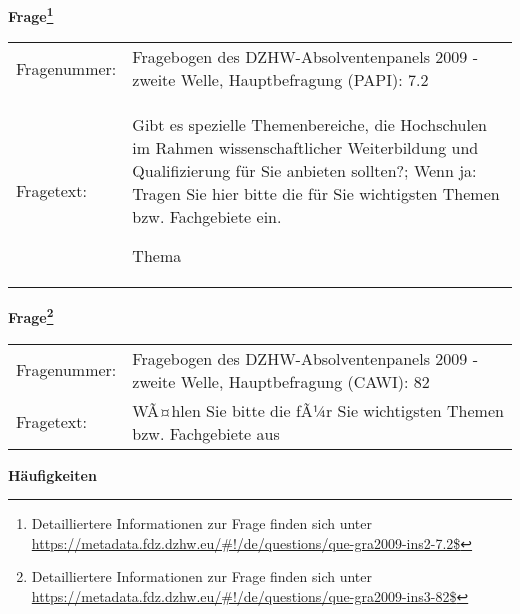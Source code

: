 				\vspace*{0.5cm}
                \noindent\textbf{Frage\footnote{Detailliertere Informationen zur Frage finden sich unter
		              \url{https://metadata.fdz.dzhw.eu/\#!/de/questions/que-gra2009-ins2-7.2$}}}\\
				\begin{tabularx}{\hsize}{@{}lX}
					Fragenummer: &
					  Fragebogen des DZHW-Absolventenpanels 2009 - zweite Welle, Hauptbefragung (PAPI):
					  7.2
 \\
					Fragetext: & Gibt es spezielle Themenbereiche, die Hochschulen im Rahmen wissenschaftlicher Weiterbildung und Qualifizierung für Sie anbieten sollten?; Wenn ja: Tragen Sie hier bitte die für Sie wichtigsten Themen bzw. Fachgebiete ein.\par  Thema \\
				\end{tabularx}
				\vspace*{0.5cm}
                \noindent\textbf{Frage\footnote{Detailliertere Informationen zur Frage finden sich unter
		              \url{https://metadata.fdz.dzhw.eu/\#!/de/questions/que-gra2009-ins3-82$}}}\\
				\begin{tabularx}{\hsize}{@{}lX}
					Fragenummer: &
					  Fragebogen des DZHW-Absolventenpanels 2009 - zweite Welle, Hauptbefragung (CAWI):
					  82
 \\
					Fragetext: & WÃ¤hlen Sie bitte die fÃ¼r Sie wichtigsten Themen bzw. Fachgebiete aus \\
				\end{tabularx}





        		\vspace*{0.5cm}
                \noindent\textbf{Häufigkeiten}

